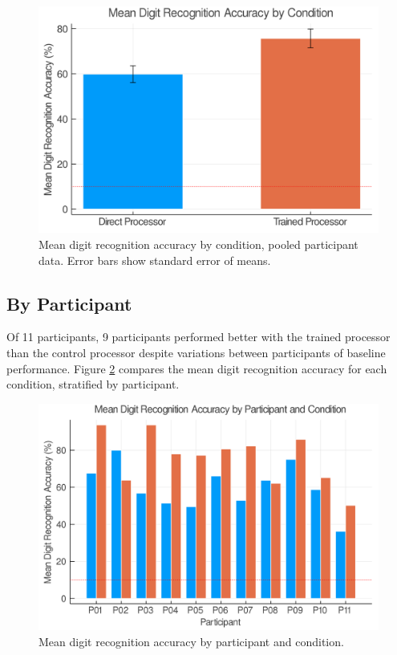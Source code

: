 \documentclass[a4paper,11pt,openany]{book}
\begin{document}
\begin{figure}[htbp]
\centering
\includegraphics[width=.9\linewidth]{./images/results_mean_accuracy_overall.png}
\caption[Mean digit recognition accuracy by condition, pooled participant data]{\label{fig:org7ecb866}
Mean digit recognition accuracy by condition, pooled participant data. Error bars show standard error of means.}
\end{figure}

\subsection*{By Participant}
\label{sec:org1072578}

Of 11 participants, 9 participants performed better with the trained processor than the control processor despite variations between participants of baseline performance.
Figure \ref{fig:org33174bf} compares the mean digit recognition accuracy for each condition, stratified by participant.

\begin{figure}[htbp]
\centering
\includegraphics[width=.9\linewidth]{./images/results_mean_accuracy_by_participant.png}
\caption{\label{fig:org33174bf}
Mean digit recognition accuracy by participant and condition.}
\end{figure}
\end{document}
